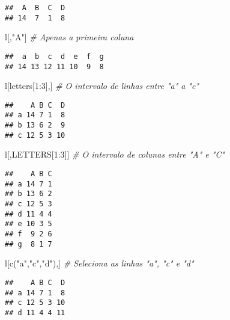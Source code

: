 \documentclass[
]{book}
\newenvironment{Shaded}{\begin{snugshade}}{\end{snugshade}}
\newcommand{\CommentTok}[1]{\textcolor[rgb]{0.56,0.35,0.01}{\textit{#1}}}
\newcommand{\DecValTok}[1]{\textcolor[rgb]{0.00,0.00,0.81}{#1}}
\newcommand{\FunctionTok}[1]{\textcolor[rgb]{0.00,0.00,0.00}{#1}}
\newcommand{\NormalTok}[1]{#1}
\newcommand{\SpecialCharTok}[1]{\textcolor[rgb]{0.00,0.00,0.00}{#1}}
\newcommand{\StringTok}[1]{\textcolor[rgb]{0.31,0.60,0.02}{#1}}
\begin{document}
\begin{verbatim}
##  A  B  C  D 
## 14  7  1  8
\end{verbatim}

\begin{Shaded}
\begin{Highlighting}[]
\NormalTok{l[,}\StringTok{"A"}\NormalTok{] }\CommentTok{\# Apenas a primeira coluna}
\end{Highlighting}
\end{Shaded}

\begin{verbatim}
##  a  b  c  d  e  f  g 
## 14 13 12 11 10  9  8
\end{verbatim}

\begin{Shaded}
\begin{Highlighting}[]
\NormalTok{l[letters[}\DecValTok{1}\SpecialCharTok{:}\DecValTok{3}\NormalTok{],] }\CommentTok{\# O intervalo de linhas entre "a" a "c"}
\end{Highlighting}
\end{Shaded}

\begin{verbatim}
##    A B C  D
## a 14 7 1  8
## b 13 6 2  9
## c 12 5 3 10
\end{verbatim}

\begin{Shaded}
\begin{Highlighting}[]
\NormalTok{l[,LETTERS[}\DecValTok{1}\SpecialCharTok{:}\DecValTok{3}\NormalTok{]] }\CommentTok{\# O intervalo de colunas entre "A" e "C"}
\end{Highlighting}
\end{Shaded}

\begin{verbatim}
##    A B C
## a 14 7 1
## b 13 6 2
## c 12 5 3
## d 11 4 4
## e 10 3 5
## f  9 2 6
## g  8 1 7
\end{verbatim}

\begin{Shaded}
\begin{Highlighting}[]
\NormalTok{l[}\FunctionTok{c}\NormalTok{(}\StringTok{"a"}\NormalTok{,}\StringTok{"c"}\NormalTok{,}\StringTok{"d"}\NormalTok{),] }\CommentTok{\# Seleciona as linhas "a", "c" e "d"}
\end{Highlighting}
\end{Shaded}

\begin{verbatim}
##    A B C  D
## a 14 7 1  8
## c 12 5 3 10
## d 11 4 4 11
\end{verbatim}
\end{document}
